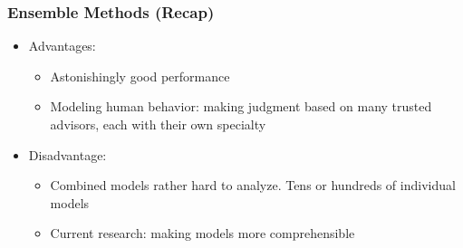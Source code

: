 \begin{frame}[fragile]\frametitle{Ensemble Methods (Recap)}
\begin{itemize}
\item Advantages:
\begin{itemize}
\item Astonishingly good performance
\item Modeling human behavior: making judgment based on many trusted advisors, each with their own specialty
\end{itemize}
\item Disadvantage:
\begin{itemize}
\item Combined models rather hard to analyze. Tens or hundreds of individual models
\item Current research: making models more comprehensible
\end{itemize}
\end{itemize}
\end{frame}

